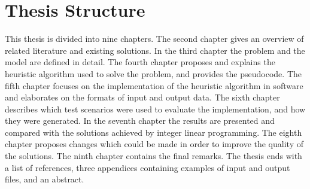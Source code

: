 \section{Thesis Structure}

This thesis is divided into nine chapters.
The second chapter gives an overview of related literature and existing solutions.
In the third chapter the problem and the model are defined in detail.
The fourth chapter proposes and explains the heuristic algorithm used to solve the problem, and provides the pseudocode.
The fifth chapter focuses on the implementation of the heuristic algorithm in software and elaborates on the formats of input and output data.
The sixth chapter describes which test scenarios were used to evaluate the implementation, and how they were generated.
In the seventh chapter the results are presented and compared with the solutions achieved by integer linear programming.
The eighth chapter proposes changes which could be made in order to improve the quality of the solutions.
The ninth chapter contains the final remarks.
The thesis ends with a list of references, three appendices containing examples of input and output files, and an abstract.
